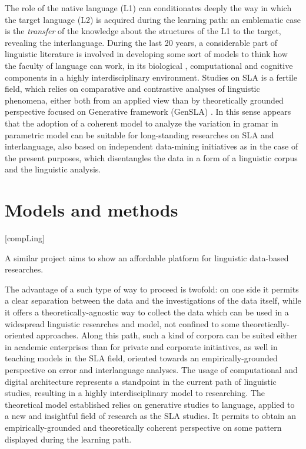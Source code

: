 \documentclass[a4paper,twoside,11pt,chapterprefix=true,listof=totocnumbered,bibliography=totocnumbered]{scrbook}
\theoremstyle{definition}
\theoremstyle{definition}
\theoremstyle{definition}
\theoremstyle{remark}
\begin{document}
The role of the native language (L1) can conditionates deeply the way in
which the target language (L2) is acquired during the learning path: an
emblematic case is the \emph{transfer} of the knowledge about the
structures of the L1 to the target, revealing the interlanguage. During
the last 20 years, a considerable part of linguistic literature is
involved in developing some sort of models to think how the faculty of
language can work, in its biological \citep{hcf2002}, computational
\citep{fodor2001} and cognitive components in a highly interdisciplinary
environment. Studies on SLA is a fertile field, which relies on
comparative and contrastive analyses of linguistic phenomena, either
both from an applied view \citep{ellis_study_101} than by theoretically
grounded perspective focused on Generative framework (GenSLA)
\citep[\citet{rothman_slabakova_2017}, \citet{hawkins2001},
\citet{sorace2011pinning}]{guasti2002}. In this sense appears that the
adoption of a coherent model to analyze the variation in gramar in
parametric model can be suitable for long-standing researches on SLA and
interlanguage, also based on independent data-mining initiatives as in
the case of the present purposes, which disentangles the data in a form
of a linguistic corpus and the linguistic analysis.

\section{Models and methods}\label{models-and-methods}

{[}compLing{]}

A similar project aims to show an affordable platform for linguistic
data-based researches.

The advantage of a such type of way to proceed is twofold: on one side
it permits a clear separation between the data and the investigations of
the data itself, while it offers a theoretically-agnostic way to collect
the data which can be used in a widespread linguistic researches and
model, not confined to some theoretically-oriented approaches. Along
this path, such a kind of corpora can be suited either in academic
enterprises than for private and corporate initiatives, as well in
teaching models in the SLA field, oriented towards an
empirically-grounded perspective on error and interlanguage analyses.
The usage of computational and digital architecture
\citep[\citet{kurdi_natural_2016-2},
\citet{kuebler-corpus_linguistics}]{clark_handbook_2010-1} represents a
standpoint in the current path of linguistic studies, resulting in a
highly interdisciplinary model to researching. The theoretical model
established relies on generative studies to language, applied to a new
and insightful field of research as the SLA studies. It permits to
obtain an empirically-grounded and theoretically coherent perspective on
some pattern displayed during the learning path.
\end{document}
